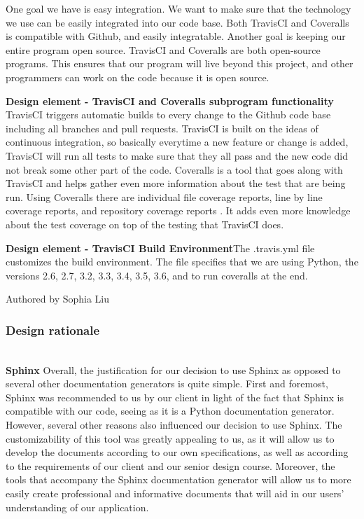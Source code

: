 \documentclass[onecolumn, draftclsnofoot,10pt, compsoc]{IEEEtran}
\begin{document}
\begin{flushleft}
\medskip

One goal we have is easy integration. We want to make sure that the technology we use can be easily integrated into our code base. Both TravisCI and Coveralls is compatible with Github, and easily integratable. Another goal is keeping our entire program open source. TravisCI and Coveralls are both open-source programs. This ensures that our program will live beyond this project, and other programmers can work on the code because it is open source.

\medskip

\textbf{Design element - TravisCI and Coveralls subprogram functionality} TravisCI triggers automatic builds to every change to the Github code base including all branches and pull requests. TravisCI is built on the ideas of continuous integration, so basically everytime a new feature or change is added, TravisCI will run all tests to make sure that they all pass and the new code did not break some other part of the code\cite{15}. Coveralls is a tool that goes along with TravisCI and helps gather even more information about the test that are being run. Using Coveralls there are individual file coverage reports, line by line coverage reports, and repository coverage reports \cite{16}. It adds even more knowledge about the test coverage on top of the testing that TravisCI does.

\medskip

\textbf{Design element -  TravisCI Build Environment}The .travis.yml file customizes the build environment\cite{15}. The file specifies that we are using Python, the versions 2.6, 2.7, 3.2, 3.3, 3.4, 3.5, 3.6, and to run coveralls at the end.

\smallskip

\footnotesize Authored by Sophia Liu
\normalsize

\bigskip

\subsubsection{Design rationale} \ \\
\textbf{Sphinx} Overall, the justification for our decision to use Sphinx as opposed to several other documentation generators is quite simple. First and foremost, Sphinx was recommended to us by our client in light of the fact that Sphinx is compatible with our code, seeing as it is a Python documentation generator. However, several other reasons also influenced our decision to use Sphinx. The customizability of this tool was greatly appealing to us, as it will allow us to develop the documents according to our own specifications, as well as according to the requirements of our client and our senior design course. Moreover, the tools that accompany the Sphinx documentation generator will allow us to more easily create professional and informative documents that will aid in our users’ understanding of our application.


\end{flushleft}
\end{document}
